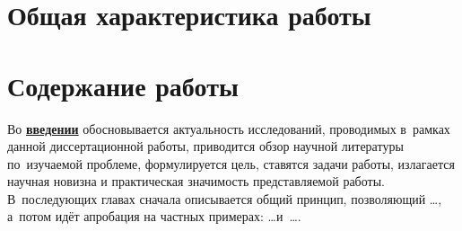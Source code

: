 \section*{Общая характеристика работы}

\newcommand{\actuality}{\pdfbookmark[1]{Актуальность}{actuality}\underline{\textbf{\actualityTXT}}}
\newcommand{\progress}{\pdfbookmark[1]{Разработанность темы}{progress}\underline{\textbf{\progressTXT}}}
\newcommand{\aim}{\pdfbookmark[1]{Цели}{aim}\underline{{\textbf\aimTXT}}}
\newcommand{\tasks}{\pdfbookmark[1]{Задачи}{tasks}\underline{\textbf{\tasksTXT}}}
\newcommand{\aimtasks}{\pdfbookmark[1]{Цели и задачи}{aimtasks}\aimtasksTXT}
\newcommand{\novelty}{\pdfbookmark[1]{Научная новизна}{novelty}\underline{\textbf{\noveltyTXT}}}
\newcommand{\influence}{\pdfbookmark[1]{Практическая значимость}{influence}\underline{\textbf{\influenceTXT}}}
\newcommand{\methods}{\pdfbookmark[1]{Методология и методы исследования}{methods}\underline{\textbf{\methodsTXT}}}
\newcommand{\defpositions}{\pdfbookmark[1]{Положения, выносимые на защиту}{defpositions}\underline{\textbf{\defpositionsTXT}}}
\newcommand{\reliability}{\pdfbookmark[1]{Достоверность}{reliability}\underline{\textbf{\reliabilityTXT}}}
\newcommand{\probation}{\pdfbookmark[1]{Апробация}{probation}\underline{\textbf{\probationTXT}}}
\newcommand{\contribution}{\pdfbookmark[1]{Личный вклад}{contribution}\underline{\textbf{\contributionTXT}}}
\newcommand{\publications}{\pdfbookmark[1]{Публикации}{publications}\underline{\textbf{\publicationsTXT}}}

\newcommand{\realisation}{\underline{\textbf{\realisationTXT}}}




\section*{Содержание работы}
Во \underline{\textbf{введении}} обосновывается актуальность
исследований, проводимых в~рамках данной диссертационной работы,
приводится обзор научной литературы по~изучаемой проблеме,
формулируется цель, ставятся задачи работы, излагается научная новизна
и практическая значимость представляемой работы. В~последующих главах
сначала описывается общий принцип, позволяющий \dots, а~потом идёт
апробация на частных примерах: \dots  и~\dots.


